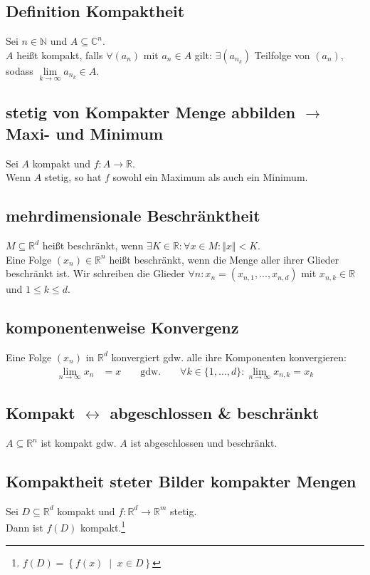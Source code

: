 \documentclass[halfparscip]{scrartcl}
\newcounter{subsection2}
\begin{document}
\subsection{Definition Kompaktheit}
Sei $n \in \mathbb{N}$ und $A \subseteq \mathbb{C}^n$.\\
$A$ heißt kompakt, falls $\forall (a_n)$ mit $a_n \in A$ gilt: $\exists (a_{n_k})$ Teilfolge von $(a_n)$, sodass \mbox{$\lim\limits_{k \rightarrow \infty} a_{n_k}\in{}A$}.

\subsection{stetig von Kompakter Menge abbilden $\rightarrow$ Maxi- und Minimum}
Sei $A$ kompakt und $f : A \rightarrow \mathbb{R}$.\\
Wenn $A$ stetig, so hat $f$ sowohl ein Maximum als auch ein Minimum.

\subsection{mehrdimensionale Beschränktheit}
$M \subseteq \mathbb{R}^d$ heißt beschränkt, wenn $\exists K \in \mathbb{R} : \forall x \in M : \Vert x\Vert < K$.\\
Eine Folge $(x_n) \in \mathbb{R}^n$ heißt beschränkt, wenn die Menge aller ihrer Glieder beschränkt ist. Wir schreiben die Glieder $\forall n: x_n = (x_{n,1},...,x_{n,d})$ mit $x_{n,k} \in \mathbb{R}$ und $1 \leq k \leq d$.

\subsection{komponentenweise Konvergenz}
Eine Folge $(x_n)$ in $\mathbb{R}^d$ konvergiert gdw. alle ihre Komponenten konvergieren:
\begin{align*}
	\lim_{n \rightarrow \infty} x_n &= x &  & \text{ gdw. } &  &\forall k \in \{1,...,d\}: \lim_{n \rightarrow \infty} x_{n,k} = x_k
\end{align*}

\subsection{Kompakt $\leftrightarrow$ abgeschlossen \& beschränkt}
$A \subseteq \mathbb{R}^n$ ist kompakt gdw. $A$ ist abgeschlossen und beschränkt.

\subsection{Kompaktheit steter Bilder kompakter Mengen}
Sei $D \subseteq \mathbb{R}^d$ kompakt und $f : \mathbb{R}^d \rightarrow \mathbb{R}^m$ stetig.\\
Dann ist $f(D)$ kompakt.\footnote{$f(D) = \left\{f(x) \;\middle|\; x \in D\right\}$}
\end{document}
